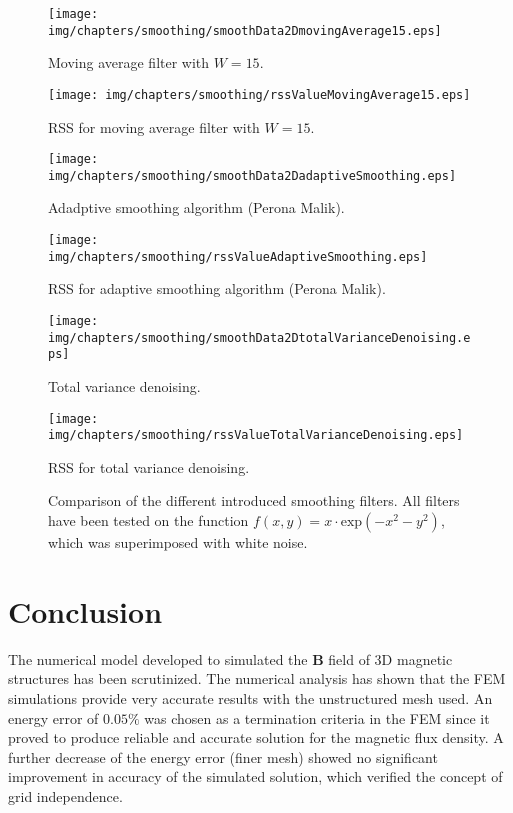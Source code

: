 \begin{figure}[htb]
  \begin{minipage}[t]{0.47\textwidth}
    \texttt{[image: img/chapters/smoothing/smoothData2DmovingAverage15.eps]}
    \caption{Moving average filter with $W=15$.}
  \end{minipage}
  \hfill
  \begin{minipage}[t]{0.47\textwidth}
    \texttt{[image: img/chapters/smoothing/rssValueMovingAverage15.eps]}
    \caption{RSS for moving average filter with $W=15$.}
  \end{minipage}

  \begin{minipage}[t]{0.47\textwidth}
    \texttt{[image: img/chapters/smoothing/smoothData2DadaptiveSmoothing.eps]}
    \caption{Adadptive smoothing algorithm (Perona Malik).}
  \end{minipage}
  \hfill
  \begin{minipage}[t]{0.47\textwidth}
    \texttt{[image: img/chapters/smoothing/rssValueAdaptiveSmoothing.eps]}
    \caption{RSS for adaptive smoothing algorithm (Perona Malik).}
  \end{minipage}
    
  \begin{minipage}[t]{0.47\textwidth}
    \texttt{[image: img/chapters/smoothing/smoothData2DtotalVarianceDenoising.eps]}
    \caption{Total variance denoising.}
  \end{minipage}
  \hfill
  \begin{minipage}[t]{0.47\textwidth}
    \texttt{[image: img/chapters/smoothing/rssValueTotalVarianceDenoising.eps]}
    \caption{RSS for total variance denoising.}
  \end{minipage}
  
  \caption[Comparison of different smoothing filters]{Comparison of the different introduced smoothing filters. All filters have been tested on the function $f(x,y) = x\cdot \text{exp}\left(-x^{2}-y^{2}\right)$, which was superimposed with white noise.}
  \label{fig:smoothingAlgorithmComparisonResult}
\end{figure}

\section{Conclusion}\label{sec:conclusionNumericalMethod}
The numerical model developed to simulated the $\mathbf{B}$ field of 3D magnetic structures has been scrutinized. The numerical analysis has shown that the FEM simulations provide very accurate results with the unstructured mesh used. An energy error of $0.05\%$ was chosen as a termination criteria in the FEM since it proved to produce reliable and accurate solution for the magnetic flux density. A further decrease of the energy error (finer mesh) showed no significant improvement in accuracy of the simulated solution, which verified the concept of grid independence. 

